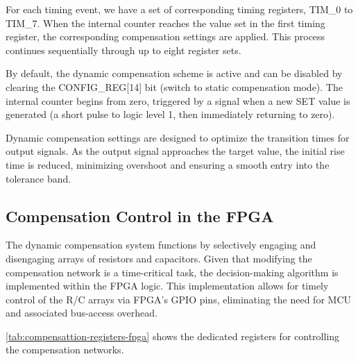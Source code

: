 For each timing event, we have a set of corresponding timing registers,
TIM\_0 to TIM\_7.
When the internal counter reaches the value set in the first timing register,
the corresponding compensation settings are applied.
This process continues sequentially through up to eight register sets.

By default, the dynamic compensation scheme is active and can be disabled by
clearing the CONFIG\_REG[14] bit (switch to static compensation mode).
The internal counter begins from zero, triggered by a signal when a new SET
value is generated (a short pulse to logic level 1, then immediately returning
to zero).

Dynamic compensation settings are designed to optimize the transition
times for output signals.
As the output signal approaches the target value, the initial rise time is
reduced, minimizing overshoot and ensuring a smooth entry into the tolerance
band.

\subsection{Compensation Control in the \acs{FPGA}}
\label{subsec:compensation-control-fpga}

The dynamic compensation system functions by selectively engaging and
disengaging arrays of resistors and capacitors.
Given that modifying the compensation network is a time-critical task,
the decision-making algorithm is implemented within the FPGA logic.
This implementation allows for timely control of the R/C arrays via
FPGA's GPIO pins, eliminating the need for \ac{MCU} and associated bus-access
overhead.

\autoref{tab:compensattion-registers-fpga} shows the dedicated registers
for controlling the compensation networks.

\begin{table}[h]
    \centering
    \caption[Compensation Registers]{
        Compensation Registers in the \acs{FPGA}
    }
    \label{tab:compensattion-registers-fpga}
\end{table}


